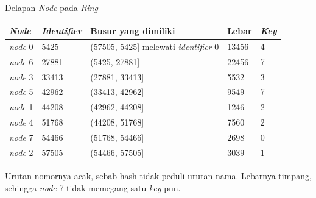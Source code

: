 \documentclass[aspectratio=169, table, 12pt]{beamer}
\begin{document}
\begin{frame}{{\Large Delapan \textit{Node} pada \textit{Ring}}}
  \vspace{4pt}
  \centering
  \scriptsize
  \begin{tabularx}{0.95\textwidth}{|l|l|X|l|l|}
    \hline
    \textbf{\textit{Node}} & \textbf{\textit{Identifier}} & \textbf{Busur yang dimiliki} & \textbf{Lebar} & \textbf{\textit{Key}} \\
    \hline
    \textit{node} 0 & 5425 & (57505, 5425] melewati \textit{identifier} 0 & 13456 & 4 \\
    \hline
    \textit{node} 6 & 27881 & (5425, 27881] & 22456 & 7 \\
    \hline
    \textit{node} 3 & 33413 & (27881, 33413] & 5532 & 3 \\
    \hline
    \textit{node} 5 & 42962 & (33413, 42962] & 9549 & 7 \\
    \hline
    \textit{node} 1 & 44208 & (42962, 44208] & 1246 & 2 \\
    \hline
    \textit{node} 4 & 51768 & (44208, 51768] & 7560 & 2 \\
    \hline
    \textit{node} 7 & 54466 & (51768, 54466] & 2698 & 0 \\
    \hline
    \textit{node} 2 & 57505 & (54466, 57505] & 3039 & 1 \\
    \hline
  \end{tabularx}

  \vspace{5pt}
  {\footnotesize Urutan nomornya acak, sebab hash tidak peduli urutan nama.
  Lebarnya timpang, sehingga \textit{node} 7 tidak memegang satu \textit{key} pun.}
\end{frame}
\end{document}
